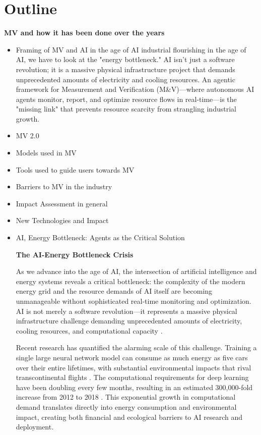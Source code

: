 \documentclass[11pt,a4paper]{article}
\begin{document}
\section{Outline}


\textbf{MV and how it has been done over the years}
\begin{itemize}
    \item Framing of MV and AI in the age of AI
    industrial flourishing in the age of AI, we have to look at the "energy bottleneck." AI isn't just a software revolution; it is a massive physical infrastructure project that demands unprecedented amounts of electricity and cooling resources.
    An agentic framework for Measurement and Verification (M&V)—where autonomous AI agents monitor, report, and optimize resource flows in real-time—is the "missing link" that prevents resource scarcity from strangling industrial growth.
    \item MV 2.0
    \item Models used in MV
    \item Tools used to guide users towards MV
    \item Barriers to MV in the industry
    \item Impact Assessment in general
    \item New Technologies and Impact
    \item AI, Energy Bottleneck: Agents as the Critical Solution
    
    \textbf{The AI-Energy Bottleneck Crisis}
    
    As we advance into the age of AI, the intersection of artificial intelligence and energy systems reveals a critical bottleneck: the complexity of the modern energy grid and the resource demands of AI itself are becoming unmanageable without sophisticated real-time monitoring and optimization. AI is not merely a software revolution—it represents a massive physical infrastructure challenge demanding unprecedented amounts of electricity, cooling resources, and computational capacity \cite{energies2024, ieee2025}.
    
    Recent research has quantified the alarming scale of this challenge. Training a single large neural network model can consume as much energy as five cars over their entire lifetimes, with substantial environmental impacts that rival transcontinental flights \cite{strubell2019energy}. The computational requirements for deep learning have been doubling every few months, resulting in an estimated 300,000-fold increase from 2012 to 2018 \cite{schwartz2019green}. This exponential growth in computational demand translates directly into energy consumption and environmental impact, creating both financial and ecological barriers to AI research and deployment.
    

\end{itemize}
\end{document}
